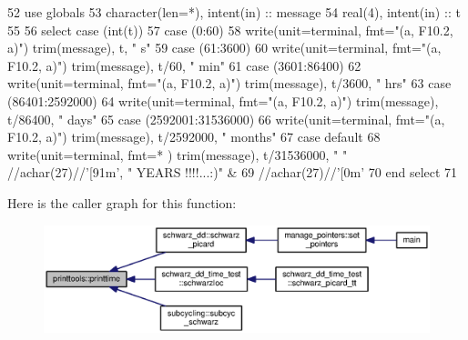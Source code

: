 \begin{DoxyCode}
52       \textcolor{keywordtype}{use }globals
53       \textcolor{keywordtype}{character(len=*)}, \textcolor{keywordtype}{intent(in)} :: message
54       \textcolor{keywordtype}{real(4)}, \textcolor{keywordtype}{intent(in)} :: t
55       
56       \textcolor{keywordflow}{select case} (int(t))
57         \textcolor{keywordflow}{case} (0:60)   
58           \textcolor{keyword}{write}(unit=terminal, fmt=\textcolor{stringliteral}{"(a, F10.2, a)"}) trim(message), t, \textcolor{stringliteral}{" s"}
59         \textcolor{keywordflow}{case} (61:3600)
60           \textcolor{keyword}{write}(unit=terminal, fmt=\textcolor{stringliteral}{"(a, F10.2, a)"}) trim(message), t/60, \textcolor{stringliteral}{" min"}
61         \textcolor{keywordflow}{case} (3601:86400)
62           \textcolor{keyword}{write}(unit=terminal, fmt=\textcolor{stringliteral}{"(a, F10.2, a)"}) trim(message), t/3600, \textcolor{stringliteral}{" hrs"}
63         \textcolor{keywordflow}{case} (86401:2592000)
64           \textcolor{keyword}{write}(unit=terminal, fmt=\textcolor{stringliteral}{"(a, F10.2, a)"}) trim(message), t/86400, \textcolor{stringliteral}{" days"}
65         \textcolor{keywordflow}{case} (2592001:31536000) 
66           \textcolor{keyword}{write}(unit=terminal, fmt=\textcolor{stringliteral}{"(a, F10.2, a)"}) trim(message), t/2592000, \textcolor{stringliteral}{" months"}
67 \textcolor{keywordflow}{        case default}
68           \textcolor{keyword}{write}(unit=terminal, fmt=* ) trim(message), t/31536000, \textcolor{stringliteral}{" "} //achar(2\textcolor{comment}{7)//}\textcolor{stringliteral}{'[91m'}\textcolor{comment}{,  }\textcolor{stringliteral}{" YEARS
       !!!!...:)"}\textcolor{comment}{ &}
69 \textcolor{comment}{                                                //achar(27)//}\textcolor{stringliteral}{'[0m'}                  
70 \textcolor{keywordflow}{      end select}
71       
\end{DoxyCode}


Here is the caller graph for this function\+:\nopagebreak
\begin{figure}[H]
\begin{center}
\leavevmode
\includegraphics[width=350pt]{namespaceprinttools_a7f7f505eb110ff0f4d983bb8f0f968b2_icgraph}
\end{center}
\end{figure}


